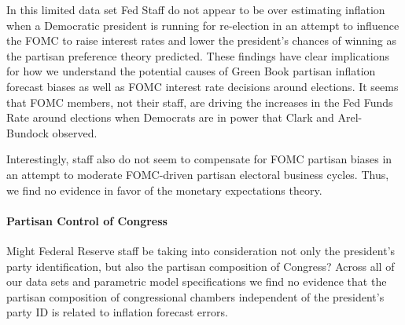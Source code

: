 \documentclass[a4paper]{article}\usepackage{graphicx, color}
\begin{document}
In this limited data set Fed Staff do not appear to be over estimating inflation when a Democratic president is running for re-election in an attempt to influence the FOMC to raise interest rates and lower the president's chances of winning as the partisan preference theory predicted. These findings have clear implications for how we understand the potential causes of Green Book partisan inflation forecast biases as well as FOMC interest rate decisions around elections. It seems that FOMC members, not their staff, are driving the increases in the Fed Funds Rate around elections when Democrats are in power that Clark and Arel-Bundock observed. 

Interestingly, staff also do not seem to compensate for FOMC partisan biases in an attempt to moderate FOMC-driven partisan electoral business cycles. Thus, we find no evidence in favor of the monetary expectations theory.

\paragraph{Partisan Control of Congress}

Might Federal Reserve staff be taking into consideration not only the president's party identification, but also the partisan composition of Congress?  Across all of our data sets and parametric model specifications we find no evidence that the partisan composition of congressional chambers independent of the president's party ID is related to inflation forecast errors. 
\end{document}
